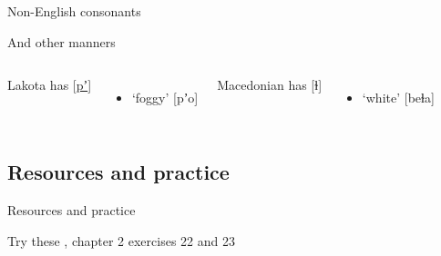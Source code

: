 \documentclass{beamer}
\newcommand{\subonethree}{Non-English consonants}
\newcommand{\subonefour}{Resources and practice}
\begin{document}
\begin{frame}[t]{\subonethree}
{\begin{block}{And other manners}
\begin{columns}
                Lakota has [\href{https://youtu.be/mfrAlv-5P1c?t=7}{pʼ}]
                \begin{itemize}
                  \item `foggy' [pʼo]
                \end{itemize}
                Macedonian has [ɫ]
                \begin{itemize}
                  \item {} `white' [beɫa]
                \end{itemize}
            \end{columns}
          \end{block}
        }
      \end{frame}

    \subsection{\subonefour}
      \begin{frame}{\subonefour}
        \begin{block}{}
          
        \end{block}
        \begin{block}{Try these}
          \textcite{dawson_language_2016}, chapter 2 exercises 22 and 23
        \end{block}
      \end{frame}
\end{document}
